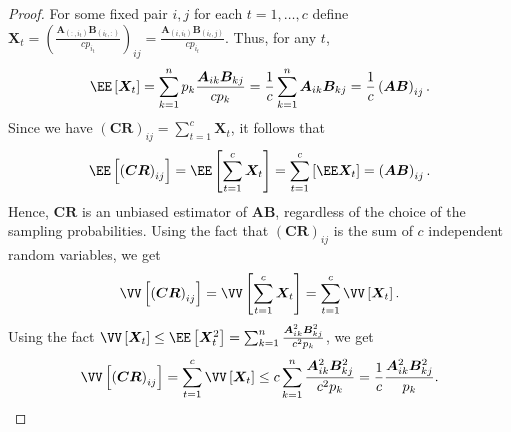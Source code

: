 \begin{proof}
    For some fixed pair $i,j$ for each $t = 1 , \ldots , c$ define $\bm{X}_t = \left( \frac{\bm{A}_{(:,i_t)} \bm{B}_{(i_t,:)}}{c p_{i_t}} \right)_{ij} = \frac{\bm{A}_{(i,i_t)} \bm{B}_{(i_t,j)}}{c p_{i_t}}$. Thus, for any $t$,
    \begin{align*}
        \EE \left[ \bm{X}_t \right] = \sum_{k=1}^{n} p_k \frac{\bm{A}_{ik} \bm{B}_{kj}}{cp_k} = \frac{1}{c} \sum_{k=1}^{n} \bm{A}_{ik} \bm{B}_{kj} = \frac{1}{c} \left( \bm{A} \bm{B} \right)_{ij}.
    \end{align*}
    Since we have $\left( \bm{C} \bm{R} \right)_{ij} = \sum_{t=1}^{c} \bm{X}_t$, it follows that
    \begin{align*}
        \EE \left[ \left( \bm{C} \bm{R} \right)_{ij} \right] = \EE \left[ \sum_{t=1}^{c} \bm{X}_t \right] = \sum_{t=1}^{c} \left[ \EE \bm{X}_t \right] = \left( \bm{A} \bm{B} \right)_{ij}.
    \end{align*}
    Hence, $\bm{C} \bm{R}$ is an unbiased estimator of $\bm{A}\bm{B}$, regardless of the choice of the sampling probabilities. Using the fact that $\left( \bm{C} \bm{R} \right)_{ij}$ is the sum of $c$ independent random variables, we get
    \begin{equation*}
        \VV \left[ \left( \bm{C} \bm{R} \right)_{ij} \right] = \VV \left[ \sum_{t=1}^{c} \bm{X}_t \right] = \sum_{t=1}^{c} \VV \left[ \bm{X}_t \right].
    \end{equation*}
    Using the fact $\VV \left[ \bm{X}_t \right] \leq \EE \left[ \bm{X}_t^2 \right] = \sum_{k=1}^n \frac{\bm{A}_{ik}^2 \bm{B}_{kj}^2}{c^2 p_k}$, we get
    \begin{equation*}
        \VV \left[ \left( \bm{C} \bm{R} \right)_{ij} \right] = \sum_{t=1}^{c} \VV \left[ \bm{X}_t \right] \leq c \sum_{k=1}^n \frac{\bm{A}_{ik}^2 \bm{B}_{kj}^2}{c^2 p_k} = \frac{1}{c} \frac{\bm{A}_{ik}^2 \bm{B}_{kj}^2}{p_k}.
    \end{equation*}
\end{proof}

